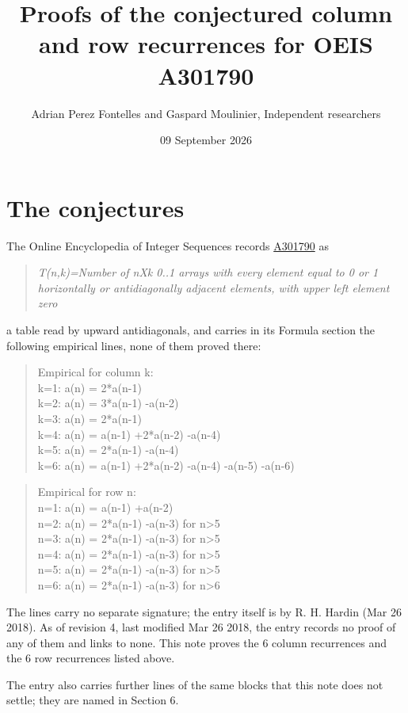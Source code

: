 \documentclass[11pt]{article}
\title{Proofs of the conjectured column and row recurrences for OEIS A301790}
\author{Adrian Perez Fontelles and Gaspard Moulinier, Independent researchers}
\date{09 September 2026}
\theoremstyle{definition}
\begin{document}
\maketitle
\section{The conjectures}

The Online Encyclopedia of Integer Sequences records \href{https://oeis.org/A301790}{A301790} as

\begin{quote}\itshape T(n,k)=Number of nXk 0..1 arrays with every element equal to 0 or 1 horizontally or antidiagonally adjacent elements, with upper left element zero\end{quote}

a table read by upward antidiagonals, and carries in its Formula section the following empirical lines, none of them proved there:

\begin{quote}\ttfamily Empirical for column k:\\
k=1: a(n) = 2*a(n-1)\\k=2: a(n) = 3*a(n-1) -a(n-2)\\k=3: a(n) = 2*a(n-1)\\k=4: a(n) = a(n-1) +2*a(n-2) -a(n-4)\\k=5: a(n) = 2*a(n-1) -a(n-4)\\k=6: a(n) = a(n-1) +2*a(n-2) -a(n-4) -a(n-5) -a(n-6)\end{quote}

\begin{quote}\ttfamily Empirical for row n:\\
n=1: a(n) = a(n-1) +a(n-2)\\n=2: a(n) = 2*a(n-1) -a(n-3) for n>5\\n=3: a(n) = 2*a(n-1) -a(n-3) for n>5\\n=4: a(n) = 2*a(n-1) -a(n-3) for n>5\\n=5: a(n) = 2*a(n-1) -a(n-3) for n>5\\n=6: a(n) = 2*a(n-1) -a(n-3) for n>6\end{quote}

The lines carry no separate signature; the entry itself is by R. H. Hardin (Mar 26 2018). As of revision 4, last modified Mar 26 2018, the entry records no proof of any of them and links to none. This note proves the 6 column recurrences and the 6 row recurrences listed above.

The entry also carries further lines of the same blocks that this note does not settle; they are named in Section 6.
\end{document}
